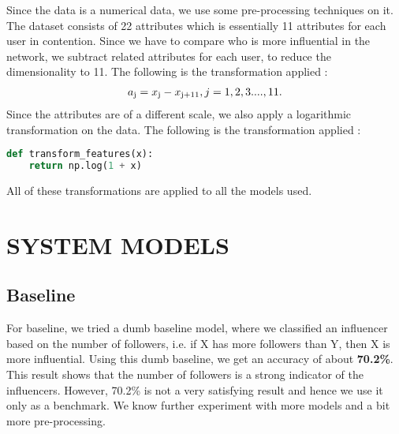 \documentclass[conference]{IEEEtran}
\numberwithin{equation}{section}
\numberwithin{figure}{section}
\numberwithin{table}{section}
\begin{document}
Since the data is a numerical data, we use some pre-processing techniques on it. The dataset consists of 22 attributes which is essentially 11 attributes for each user in contention. Since we have to compare who is more influential in the network, we subtract related attributes for each user, to reduce the dimensionality to 11. The following is the transformation applied : 
\begin{align*}
a\textsubscript{j} = x\textsubscript{j} - x\textsubscript{j+11}, j = 1,2,3 .... , 11. 
\end{align*}
Since the attributes are of a different scale, we also apply a logarithmic transformation on the data. The following is the transformation applied :
\begin{lstlisting}[language=Python, caption = Log Transformation ]
def transform_features(x):
    return np.log(1 + x)
\end{lstlisting}
All of these transformations are applied to all the models used.
\section{SYSTEM MODELS
}\label{sec:fig-tables}


\subsection{Baseline}\label{sec:cap-num}
For baseline, we tried a dumb baseline model, where we classified an influencer based on the number of followers, i.e. if X has more followers than Y, then X is more influential. Using this dumb baseline, we get an accuracy of about \textbf{70.2\%}. This result shows
that the number of followers is a strong indicator
of the influencers. However, 70.2\% is not a very satisfying result and hence we use it only as a benchmark. We know further experiment with more models and a bit more pre-processing.
\end{document}
